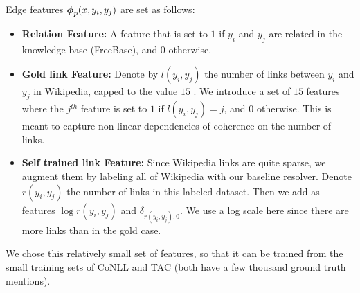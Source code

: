 Edge features $\boldsymbol{\phi}_p(x,y_i,y_j)$ are set as follows:
\begin{itemize}
\item {\bf Relation Feature:} A feature that is set to $1$ if $y_i$ and $y_j$ are related in the knowledge base (FreeBase), and $0$ otherwise.
\item {\bf Gold link Feature:} Denote by $l(y_i,y_j)$ the number of links between $y_i$ and $y_j$ in Wikipedia, capped to the value $15$ . We introduce a set of $15$ features where the $j^{th}$ feature is set to $1$ if $l(y_i,y_j) = j$, and $0$ otherwise. This is meant to capture non-linear dependencies of coherence
on the number of links.
\item {\bf Self trained link Feature:} Since Wikipedia links are quite sparse, we augment them by labeling all of Wikipedia with our baseline resolver. %
Denote $r(y_i,y_j)$ the number of links in this labeled dataset. Then we add as features $\log{r(y_i,y_j)}$ and $\delta_{r(y_i,y_j),0}$. We use a log scale here since there are more links than in the gold case. 
\end{itemize}
We chose this relatively small set of features, so that it can be trained from the small training sets of CoNLL and TAC (both have a few thousand ground truth mentions).